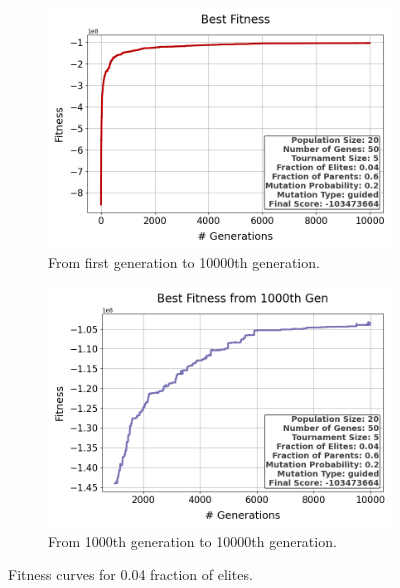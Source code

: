 \documentclass{assignment}
\begin{document}
\begin{figure}[H]
    \begin{subfigure}{0.5\textwidth}
        \includegraphics[width=\textwidth]{figures/best_fitness_output_20_50_5_0.04_0.6_0.2_guided.png}
        \caption{From first generation to 10000th generation.}
    \end{subfigure}\hfill
    \begin{subfigure}{0.5\textwidth}
        \includegraphics[width=\textwidth]{figures/best_fitness_1000_output_20_50_5_0.04_0.6_0.2_guided.png}
        \caption{From 1000th generation to 10000th generation.}
    \end{subfigure}
    \caption{Fitness curves for 0.04 fraction of elites.}
\label{fig:0.04elites}
\end{figure}
\end{document}
